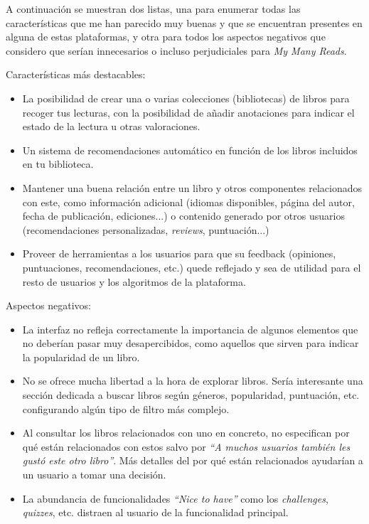 A continuación se muestran dos listas, una para enumerar todas las características que me han parecido muy buenas y que se encuentran presentes en alguna de estas plataformas, y otra para todos los aspectos negativos que considero que serían innecesarios o incluso perjudiciales para \textit{My Many Reads}.

Características más destacables:

\begin{itemize}
\item La posibilidad de crear una o varias colecciones (bibliotecas) de libros para recoger tus lecturas, con la posibilidad de añadir anotaciones para indicar el estado de la lectura u otras valoraciones.
\item Un sistema de recomendaciones automático en función de los libros incluidos en tu biblioteca.
\item Mantener una buena relación entre un libro y otros componentes relacionados con este, como información adicional (idiomas disponibles, página del autor, fecha de publicación, ediciones...) o contenido generado por otros usuarios (recomendaciones personalizadas, \textit{reviews}, puntuación...)
\item Proveer de herramientas a los usuarios para que su feedback (opiniones, puntuaciones, recomendaciones, etc.) quede reflejado y sea de utilidad para el resto de usuarios y los algoritmos de la plataforma.
\end{itemize}

Aspectos negativos:

\begin{itemize}
\item La interfaz no refleja correctamente la importancia de algunos elementos que no deberían pasar muy desapercibidos, como aquellos que sirven para indicar la popularidad de un libro.
\item No se ofrece mucha libertad a la hora de explorar libros. Sería interesante una sección dedicada a buscar libros según géneros, popularidad, puntuación, etc. configurando algún tipo de filtro más complejo.
\item Al consultar los libros relacionados con uno en concreto, no especifican por qué están relacionados con estos salvo por \textit{``A muchos usuarios también les gustó este otro libro''}. Más detalles del por qué están relacionados ayudarían a un usuario a tomar una decisión.
\item La abundancia de funcionalidades \textit{``Nice to have''} como los \textit{challenges}, \textit{quizzes}, etc. distraen al usuario de la funcionalidad principal.
\end{itemize}

